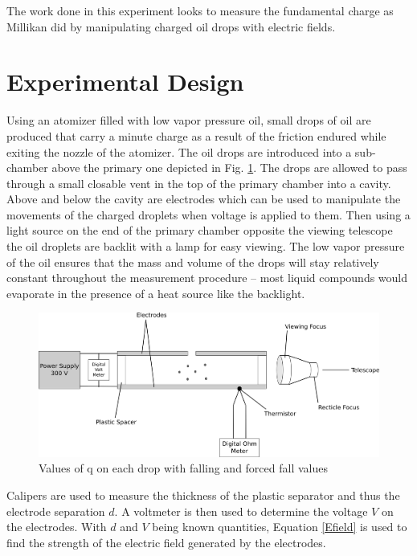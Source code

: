 \documentclass[prb,preprint]{revtex4-1}
\begin{document}
The work done in this experiment looks to measure the fundamental charge as Millikan did by manipulating charged oil drops with electric fields.

\newpage

\section{Experimental Design}
Using an atomizer filled with low vapor pressure oil, small drops of oil are produced that carry a minute charge as a result of the friction endured while exiting the nozzle of the atomizer. The oil drops are introduced into a sub-chamber above the primary one depicted in Fig. \ref{ExpFig}. The drops are allowed to pass through a small closable vent in the top of the primary chamber into a cavity. Above and below the cavity are electrodes which can be used to manipulate the movements of the charged droplets when voltage is applied to them. Then using a light source on the end of the primary chamber opposite the viewing telescope the oil droplets are backlit with a lamp for easy viewing. The low vapor pressure of the oil ensures that the mass and volume of the drops will stay relatively constant throughout the measurement procedure -- most liquid compounds would evaporate in the presence of a heat source like the backlight.

\begin{figure}[h]
\centering
\includegraphics[width=\textwidth]{ExpFig.png}
\caption{Values of q on each drop with falling and forced fall values}
\label{ExpFig}
\end{figure}

Calipers are used to measure the thickness of the plastic separator and thus the electrode separation $d$. A voltmeter is then used to determine the voltage $V$ on the electrodes. With $d$ and $V$ being known quantities, Equation \eqref{Efield} is used to find the strength of the electric field generated by the electrodes.
\end{document}
